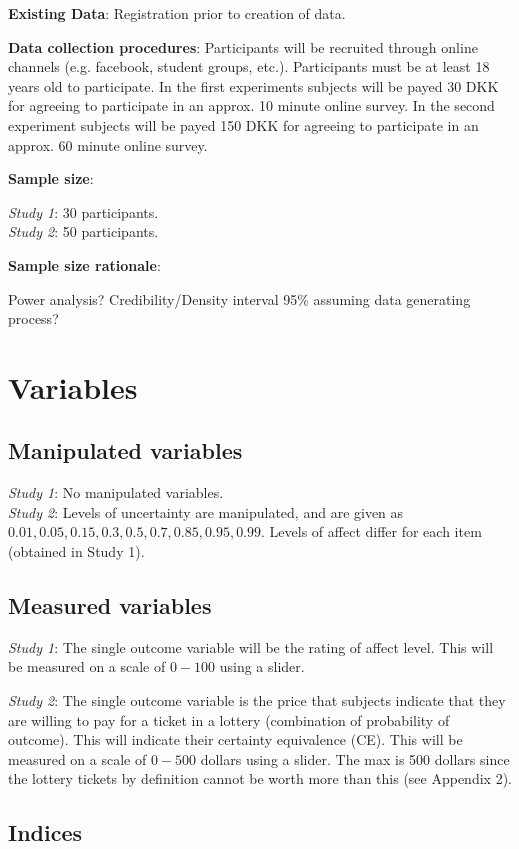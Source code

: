 \documentclass[12pt]{article}
\begin{document}
\textbf{Existing Data}: Registration prior
to creation of data.

\textbf{Data collection procedures}:
Participants will be recruited through online
channels (e.g. facebook, student groups, etc.).
Participants must be at least 18 years old to
participate. In the first experiments subjects
will be payed 30 DKK for agreeing to participate
in an approx. 10 minute online survey. In the
second experiment subjects will be payed 150 DKK
for agreeing to participate in an approx. 60 minute
online survey.

\textbf{Sample size}:

\emph{Study 1}: 30 participants. \\
\emph{Study 2}: 50 participants.

\textbf{Sample size rationale}:

Power analysis?
Credibility/Density interval 95\%
assuming data generating process?

\section{Variables}

\subsection{Manipulated variables}
\emph{Study 1}: No manipulated variables. \\

\emph{Study 2}: Levels of uncertainty are
manipulated, and are given as
$0.01, 0.05, 0.15, 0.3, 0.5, 0.7, 0.85, 0.95, 0.99$.
Levels of affect differ for each item
(obtained in Study 1).

\subsection{Measured variables}
\emph{Study 1}: The single outcome variable
will be the rating of affect level. This will
be measured on a scale of $0-100$ using a
slider.

\emph{Study 2}: The single outcome variable
is the price that subjects indicate that they
are willing to pay for a ticket in a lottery
(combination of probability of outcome).
This will indicate their certainty equivalence (CE).
This will be measured on a scale of $0-500$ dollars
using a slider. The max is 500 dollars since the
lottery tickets by definition cannot be worth
more than this (see Appendix 2).

\subsection{Indices}
\end{document}
